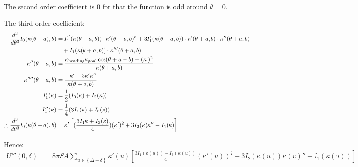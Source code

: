 \documentclass[11pt,a4paper]{article}
\begin{document}
  The second order coefficient is $0$ for that the function is odd around $\theta = 0$. 

  The third order coefficient:
  \begin{align}
    \frac{d ^{3}}{d \theta ^{3}} I_0(\kappa(\theta + a), b) & = I_1 ^{''} (\kappa(\theta + a, b)) \cdot \kappa{'}(\theta + a, b)^3 + 3I_1'(\kappa(\theta + a, b)) \cdot \kappa{'}(\theta + a, b) \cdot \kappa{''}(\theta + a, b) \notag \\
    & \quad + I_1(\kappa(\theta + a, b)) \cdot \kappa{'''}(\theta + a, b) \notag\\
    \kappa {''}(\theta + a, b)& = \frac{\kappa_{\mathrm{heading}} \kappa_{\mathrm{goal}} \cos(\theta + a - b) - (\kappa')^{2}}{\kappa(\theta + a, b)} \notag \\
    \kappa {''''} (\theta + a, b) & = \frac{-\kappa' - 3\kappa' \kappa''}{\kappa(\theta + a, b)} \notag\\
    I'_1(\kappa) & = \frac{1}{2}(I_0(\kappa) + I_2(\kappa)) \notag \\
    I''_1(\kappa) & = \frac{1}{4}(3I_1(\kappa) + I_3(\kappa)) \notag \\
    \therefore  \frac{d ^{3}}{d \theta ^{3}} I_0(\kappa(\theta + a), b) &= \kappa ' \left[ (\frac{3I_1{\kappa} + I_3(\kappa)}{4})(\kappa')^{2} + 3 I _2(\kappa)\kappa'' - I_1(\kappa) \right]
  \end{align}

  Hence: 
  \begin{align}
    U'''(0, \delta) & = 8\pi SA \sum_{u \in \left\{ \Delta \pm \delta \right\}} \kappa'(u)\left[ \frac{3I_1(\kappa(u)) + I_3(\kappa(u))}{4}(\kappa'(u))^{2} + 3I_2(\kappa(u))\kappa(u)'' - I_1(\kappa(u)) \right]
  \end{align}


\setcounter{figure}{0}
\renewcommand{\thefigure}{S\arabic{figure}}
\renewcommand{\figurename}{Supplementary Figure}

\setcounter{subsection}{0}
\renewcommand{\thesubsection}{S\arabic{subsection}}
\renewcommand{\thesubsubsection}{S\arabic{subsection}.\arabic{subsubsection}}

\clearpage

%
\end{document}

